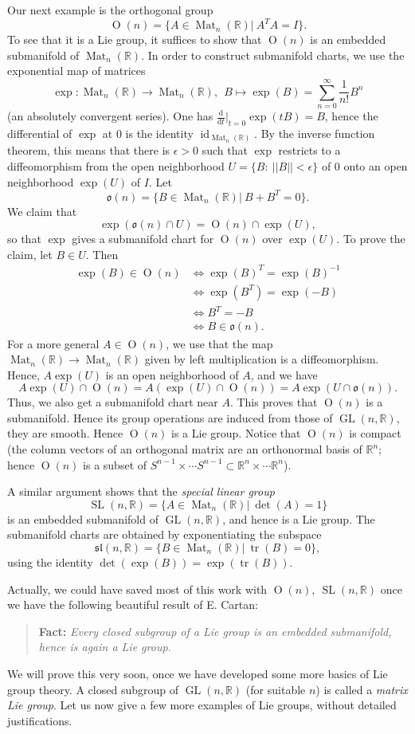 \documentclass{article}
\theoremstyle{remark}
\newcommand{\R}{\mathbb{R}}
\newcommand{\on}{\operatorname}
\newcommand{\GL}{ \on{GL}}
\newcommand{\SL}{ \on{SL}}
\renewcommand{\d}{{\mbox{d}}}
\newcommand\eps{\epsilon}
\newcommand{\f}{\frac}
\newcommand{\mf}{\mathfrak}
\begin{document}
Our next example is the orthogonal group
%
\[ \on{O}(n)=\{A\in \on{Mat}_n(\R)|\ A^T A=I\}.\]
% 
To see that it is a Lie group, it suffices to show that $\on{O}(n)$ is an embedded submanifold of $\on{Mat}_n(\R)$. In order to construct submanifold charts, we use the exponential map of matrices 
%
\[ \exp\colon \on{Mat}_n(\R)\to \on{Mat}_n(\R),\ \ 
B\mapsto \exp(B)=\sum_{n=0}^\infty \f{1}{n!} B^n\]
%
(an absolutely convergent series). One has $\f{\d}{\d
t}|_{t=0}\exp(tB)=B$, hence the differential of $\exp$ at $0$ is the
identity $\on{id}_{\on{Mat}_n(\R)}$. By the inverse function theorem,
this means that there is $\eps>0$ such that $\exp$ restricts to a 
diffeomorphism from the open neighborhood $U=\{B:\ ||B||<\eps\}$ of $0$ 
onto an open neighborhood $\exp(U)$ of $I$. 
Let 
\[ \mf{o}(n)=\{B\in \on{Mat}_n(\R)|\ B+B^T=0\}.\]
%
We claim that 
\[ \exp(\mf{o}(n)\cap U)=\on{O}(n)\cap \exp(U),\]
%
so that $\exp$ gives a submanifold chart for $\on{O}(n)$ over 
$\exp(U)$. To prove the claim, let $B\in U$. Then 
\[ \begin{split} \exp(B)\in \on{O}(n) & \Leftrightarrow 
\exp(B)^T=\exp(B)^{-1}\\
& \Leftrightarrow 
\exp(B^T)=\exp(-B)\\
& \Leftrightarrow 
B^T=-B\\
& \Leftrightarrow B\in \mf{o}(n).
\end{split} 
\]
For a more general $A\in \on{O}(n)$, we use that the map 
$\on{Mat}_n(\R)\to \on{Mat}_n(\R)$ given by left multiplication is a 
diffeomorphism. Hence, $A\exp(U)$ is an open neighborhood of $A$, 
and we have 
\[ A\exp(U)\cap \on{O}(n)=A(\exp(U)\cap \on{O}(n))=A\exp(U\cap \mf{o}(n)).\]
%
Thus, we also get a submanifold chart near $A$. This proves that $\on{O}(n)$ 
is a submanifold. Hence its group operations are induced from those of 
$\GL(n,\R)$, they are smooth. Hence $\on{O}(n)$ is a Lie group. 
Notice that $\on{O}(n)$ is compact (the column vectors of an orthogonal matrix 
are an orthonormal basis of $\R^n$; hence $\on{O}(n)$ is a subset of 
$S^{n-1}\times\cdots S^{n-1}\subset \R^n\times\cdots \R^n$). 

A similar argument shows that the \emph{special linear group}
\[ \SL(n,\R)=\{A\in \on{Mat}_n(\R)|\ \det(A)=1\}\]
is an embedded submanifold of $\GL(n,\R)$, and hence is a Lie group. 
The submanifold charts are obtained by exponentiating the subspace 
\[ \mf{sl}(n,\R)=\{B\in \on{Mat}_n(\R)|\ \on{tr}(B)=0\},\]
using the identity $\det(\exp(B))=\exp(\on{tr}(B))$. 

Actually, we could have saved most of this work with $\on{O}(n),\
\SL(n,\R)$ once we have the following beautiful result of E. Cartan:
\begin{quote}
{\bf Fact:} \emph{Every closed subgroup of a Lie group is an embedded submanifold, 
hence is again a Lie group.} 
\end{quote}
%
We will prove this very soon, once we have developed some more basics
of Lie group theory. A closed subgroup of $\GL(n,\R)$ (for suitable $n$) is 
called a \emph{matrix Lie group}. Let us now give a few more examples of Lie
groups, without detailed justifications. 
\end{document}
